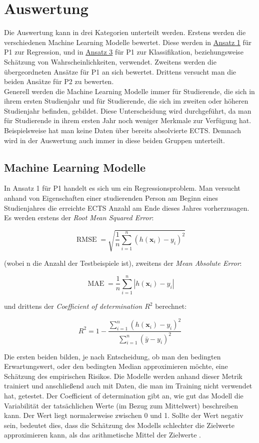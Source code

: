 

\section{Auswertung}
\label{sec:auswertung}
Die Auswertung kann in drei Kategorien unterteilt werden. Erstens werden die verschiedenen Machine Learning Modelle bewertet.
Diese werden in \hyperref[sec:appr1]{Ansatz 1} f\"ur P1 zur Regression, und in \hyperref[sec:appr2]{Ansatz 3} f\"ur P1 zur Klassifikation,
beziehungsweise Sch\"atzung von Wahrscheinlichkeiten, verwendet.
Zweitens werden die \"ubergeordneten Ans\"atze f\"ur P1 an sich bewertet.
Drittens versucht man die beiden Ans\"atze f\"ur P2 zu bewerten. \\

Generell werden die Machine Learning Modelle immer f\"ur Studierende, die sich in ihrem ersten Studienjahr und f\"ur Studierende, die sich im
zweiten oder h\"oheren Studienjahr befinden, gebildet. Diese Unterscheidung wird durchgef\"uhrt, da man f\"ur Studierende in ihrem ersten Jahr noch
weniger Merkmale zur Verf\"ugung hat. Beispielsweise hat man keine Daten \"uber bereits absolvierte ECTS. Demnach wird in der Auswertung
auch immer in diese beiden Gruppen unterteilt.


\subsection{Machine Learning Modelle}
In Ansatz 1 f\"ur P1 handelt es sich um ein Regressionsproblem. Man versucht anhand von Eigenschaften einer studierenden Person am Beginn eines Studienjahres
die erreichte ECTS Anzahl am Ende dieses Jahres vorherzusagen. Es werden erstens der
\textit{Root Mean Squared Error}:

$$ \operatorname{RMSE} = \sqrt{\frac{1}{n}\sum_{i = 1}^{n}(h(\mathbf{x}_i)-y_i)^2} $$

(wobei n die Anzahl der Testbeispiele ist), zweitens der \textit{Mean Absolute Error}:

$$ \operatorname{MAE} = \frac{1}{n}\sum_{i = 1}^{n}|h(\mathbf{x}_i) - y_i| $$

und drittens der \textit{Coefficient of determination $R^2$} berechnet:

$$ R^2 = 1 - \frac{\sum_{i = 1}^{n}(h(\mathbf{x}_i) - y_i)^2}{\sum_{i=1}^n(\bar{y}-y_i)^2} $$

Die ersten beiden bilden, je nach Entscheidung, ob man den bedingten Erwartungswert, oder den bedingten Median
approximieren m\"ochte, eine Sch\"atzung des empirischen Risikos. Die Modelle werden anhand dieser Metrik trainiert und anschlie{\ss}end
auch mit Daten, die man im Training nicht verwendet hat, getestet. Der Coefficient of determination gibt an, wie gut das Modell
die Variabilit\"at der tats\"achlichen Werte (im Bezug zum Mittelwert) beschreiben kann. Der Wert liegt normalerweise zwischen 0 und 1. Sollte der Wert negativ sein,
bedeutet dies, dass die Sch\"atzung des Modells schlechter die Zielwerte approximieren kann, als das arithmetische Mittel der Zielwerte \cite{guttag}.  \\


